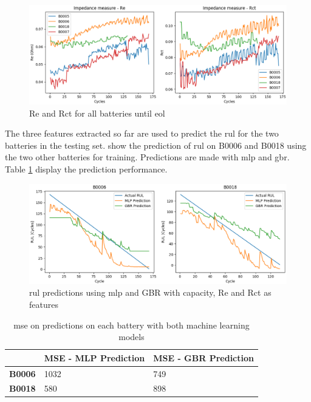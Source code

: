 \documentclass[english, a4paper]{report}
\begin{document}
{{{{                \begin{figure}[H]
                    \centering \includegraphics[width=1\textwidth]{ReAndRctMeasure}
                    \caption{Re and Rct for all batteries until \gls{eol}}
                    \label{fig:ReAndRctMeasure}
                \end{figure}
                
                The three features extracted so far are used to predict the \gls{rul} for the two batteries in the testing set.  show the prediction of \gls{rul} on B0006 and B0018 using the two other batteries for training. Predictions are made with \gls{mlp} and \gls{gbr}. Table \ref{BatteryPredSimple} display the prediction performance.
                
                \begin{figure}[H]
                    \centering \includegraphics[width=1\textwidth]{Prediction-SimpleFeatures}
                    \caption{\gls{rul} predictions using \gls{mlp} and GBR with capacity, Re and Rct as features}
                    \label{fig:Prediction-SimpleFeatures}
                \end{figure}
                
                \begin{table}[H]
                    \centering
                    \begin{tabular}{|l|l|l|}
                        \hline
                         & \textbf{MSE - MLP Prediction} & \textbf{MSE - GBR Prediction} \\ \hline
                        \textbf{B0006} & 1032 & 749 \\ \hline
                        \textbf{B0018} & 580 & 898 \\ \hline
                    \end{tabular}
                    \caption{\gls{mse} on predictions on each battery with both machine learning models}
                    \label{BatteryPredSimple}
                \end{table}
                
}}}}
\end{document}
